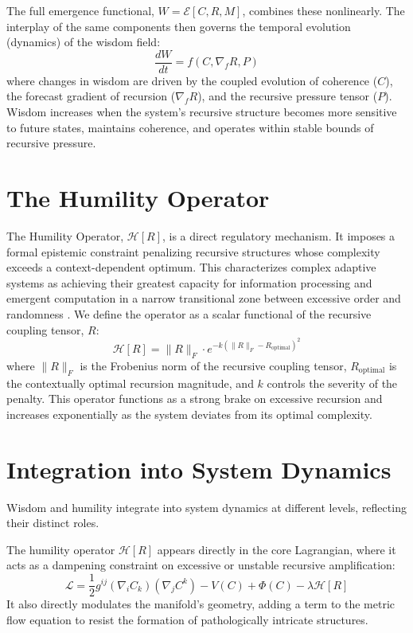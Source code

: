 The full emergence functional, \(W = \mathcal{E}[C, R, M]\), combines these nonlinearly. The interplay of the same components then governs the temporal evolution (dynamics) of the wisdom field:
\begin{equation}
\frac{dW}{dt} = f(C, \nabla_f R, P)
\end{equation}
where changes in wisdom are driven by the coupled evolution of coherence (\(C\)), the forecast gradient of recursion (\(\nabla_f R\)), and the recursive pressure tensor (\(P\)). Wisdom increases when the system's recursive structure becomes more sensitive to future states, maintains coherence, and operates within stable bounds of recursive pressure.

\section{The Humility Operator}\label{sec:humility_operator}

The Humility Operator, \(\mathcal{H}[R]\), is a direct regulatory mechanism. It imposes a formal epistemic constraint penalizing recursive structures whose complexity exceeds a context-dependent optimum. This characterizes complex adaptive systems as achieving their greatest capacity for information processing and emergent computation in a narrow transitional zone between excessive order and randomness \autocite{Langton1990}. We define the operator as a scalar functional of the recursive coupling tensor, \(R\):
\begin{equation}
\mathcal{H}[R] = \|R\|_F \cdot e^{-k(\|R\|_F - R_{\text{optimal}})^2}
\end{equation}
where \(\|R\|_F\) is the Frobenius norm of the recursive coupling tensor, \(R_{\text{optimal}}\) is the contextually optimal recursion magnitude, and \(k\) controls the severity of the penalty. This operator functions as a strong brake on excessive recursion and increases exponentially as the system deviates from its optimal complexity.

\section{Integration into System Dynamics}\label{sec:integration_into_system_dynamics}

Wisdom and humility integrate into system dynamics at different levels, reflecting their distinct roles.

The humility operator \(\mathcal{H}[R]\) appears directly in the core Lagrangian, where it acts as a dampening constraint on excessive or unstable recursive amplification:
\begin{equation}
\mathcal{L} = \frac{1}{2} g^{ij} (\nabla_i C_k)(\nabla_j C^k) - V(C) + \Phi(C) - \lambda \mathcal{H}[R]
\end{equation}
It also directly modulates the manifold's geometry, adding a term to the metric flow equation to resist the formation of pathologically intricate structures.

